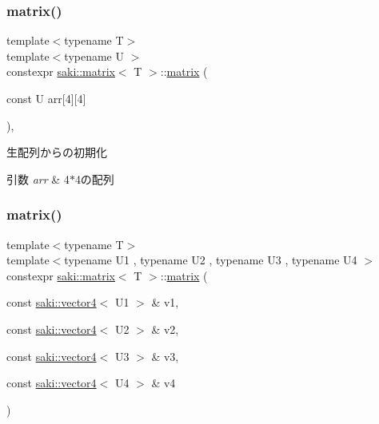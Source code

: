 \subsubsection{\texorpdfstring{matrix()}{matrix()}\hspace{0.1cm}{\footnotesize\ttfamily [3/6]}}
{\footnotesize\ttfamily template$<$typename T$>$ \\
template$<$typename U $>$ \\
constexpr \mbox{\hyperlink{classsaki_1_1matrix}{saki\+::matrix}}$<$ T $>$\+::\mbox{\hyperlink{classsaki_1_1matrix}{matrix}} (\begin{DoxyParamCaption}\item[{const U}]{arr\mbox{[}4\mbox{]}\mbox{[}4\mbox{]} }\end{DoxyParamCaption})\hspace{0.3cm}{\ttfamily [inline]}, {\ttfamily [explicit]}}



生配列からの初期化 


\begin{DoxyParams}{引数}
{\em arr} & 4$\ast$4の配列 \\
\hline
\end{DoxyParams}
\mbox{\label{classsaki_1_1matrix_a05256e26b2d44fe97a157c5bb510cdaf}} 
\subsubsection{\texorpdfstring{matrix()}{matrix()}\hspace{0.1cm}{\footnotesize\ttfamily [4/6]}}
{\footnotesize\ttfamily template$<$typename T$>$ \\
template$<$typename U1 , typename U2 , typename U3 , typename U4 $>$ \\
constexpr \mbox{\hyperlink{classsaki_1_1matrix}{saki\+::matrix}}$<$ T $>$\+::\mbox{\hyperlink{classsaki_1_1matrix}{matrix}} (\begin{DoxyParamCaption}\item[{const \mbox{\hyperlink{classsaki_1_1vector4}{saki\+::vector4}}$<$ U1 $>$ \&}]{v1,  }\item[{const \mbox{\hyperlink{classsaki_1_1vector4}{saki\+::vector4}}$<$ U2 $>$ \&}]{v2,  }\item[{const \mbox{\hyperlink{classsaki_1_1vector4}{saki\+::vector4}}$<$ U3 $>$ \&}]{v3,  }\item[{const \mbox{\hyperlink{classsaki_1_1vector4}{saki\+::vector4}}$<$ U4 $>$ \&}]{v4 }\end{DoxyParamCaption})\hspace{0.3cm}{\ttfamily [inline]}}



